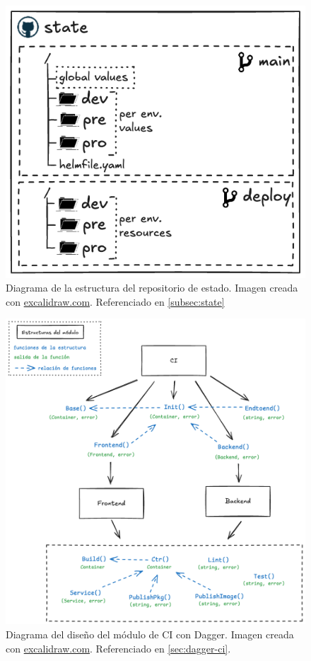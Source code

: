\begin{figure}[h]
  \centerline{\includegraphics[width=12cm]{figuras/state}}
  \caption{Diagrama de la estructura del repositorio de estado. Imagen creada con \href{https://excalidraw.com}{excalidraw.com}. Referenciado en \ref{subsec:state}}
  \label{fig:state}
\end{figure}

\begin{figure}[h]
  \centerline{\includegraphics[width=12cm]{figuras/dagger-CI}}
  \caption{Diagrama del diseño del módulo de CI con Dagger. Imagen creada con \href{https://excalidraw.com}{excalidraw.com}. Referenciado en \ref{sec:dagger-ci}.}
  \label{fig:dagger-ci}
\end{figure}

